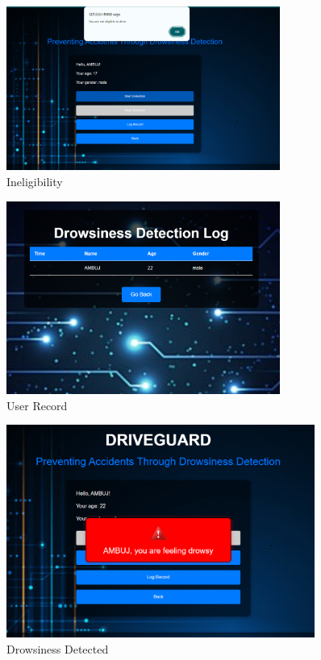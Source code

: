 \documentclass[12pt]{article}
\begin{document}
\begin{figure}[h]
\centering
\includegraphics[width=0.8\textwidth]{IN}
\caption{Ineligibility}
\end{figure}
\FloatBarrier

\begin{figure}[h]
\centering
\includegraphics[width=0.8\textwidth]{UR}
\caption{User Record}
\end{figure}
\FloatBarrier

\begin{figure}[h]
\centering
\includegraphics[width=0.9\textwidth]{DD}
\caption{Drowsiness Detected}
\end{figure}
\FloatBarrier
\end{document}
